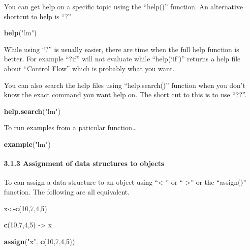 \documentclass[
]{article}
\newenvironment{Shaded}{\begin{snugshade}}{\end{snugshade}}
\newcommand{\DecValTok}[1]{\textcolor[rgb]{0.00,0.00,0.81}{#1}}
\newcommand{\FunctionTok}[1]{\textcolor[rgb]{0.13,0.29,0.53}{\textbf{#1}}}
\newcommand{\NormalTok}[1]{#1}
\newcommand{\OtherTok}[1]{\textcolor[rgb]{0.56,0.35,0.01}{#1}}
\newcommand{\StringTok}[1]{\textcolor[rgb]{0.31,0.60,0.02}{#1}}
\begin{document}
You can get help on a specific topic using the ``help()'' function. An
alternative shortcut to help is ``?''

\begin{Shaded}
\begin{Highlighting}[]
\FunctionTok{help}\NormalTok{(}\StringTok{"lm"}\NormalTok{)}
\end{Highlighting}
\end{Shaded}

While using ``?'' is usually easier, there are time when the full help
function is better. For example ``?if'' will not evaluate while
``help(`if')'' returns a help file about ``Control Flow'' which is
probably what you want.

You can also search the help files using ``help.search()'' function when
you don't know the exact command you want help on. The short cut to this
is to use ``??''.

\begin{Shaded}
\begin{Highlighting}[]
\FunctionTok{help.search}\NormalTok{(}\StringTok{"lm"}\NormalTok{)}
\end{Highlighting}
\end{Shaded}

To run examples from a paticular function\ldots{}

\begin{Shaded}
\begin{Highlighting}[]
\FunctionTok{example}\NormalTok{(}\StringTok{"lm"}\NormalTok{)}
\end{Highlighting}
\end{Shaded}

\paragraph{3.1.3 Assignment of data structures to
objects}\label{assignment-of-data-structures-to-objects}

To can assign a data structure to an object using ``\textless-'' or
``-\textgreater{}'' or the ``assign()'' function. The following are all
equivalent.

\begin{Shaded}
\begin{Highlighting}[]
\NormalTok{x}\OtherTok{\textless{}{-}}\FunctionTok{c}\NormalTok{(}\DecValTok{10}\NormalTok{,}\DecValTok{7}\NormalTok{,}\DecValTok{4}\NormalTok{,}\DecValTok{5}\NormalTok{)}

\FunctionTok{c}\NormalTok{(}\DecValTok{10}\NormalTok{,}\DecValTok{7}\NormalTok{,}\DecValTok{4}\NormalTok{,}\DecValTok{5}\NormalTok{) }\OtherTok{{-}\textgreater{}}\NormalTok{ x}

\FunctionTok{assign}\NormalTok{(}\StringTok{"x"}\NormalTok{, }\FunctionTok{c}\NormalTok{(}\DecValTok{10}\NormalTok{,}\DecValTok{7}\NormalTok{,}\DecValTok{4}\NormalTok{,}\DecValTok{5}\NormalTok{))}
\end{Highlighting}
\end{Shaded}
\end{document}
